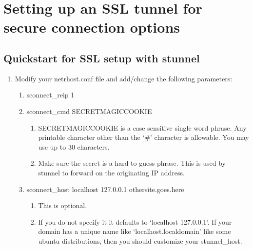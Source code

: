 \documentclass[letterpaper,10pt,english]{sphinxmanual}
\begin{document}
\section{Setting up an SSL tunnel for secure connection options}
\label{\detokenize{security:setting-up-an-ssl-tunnel-for-secure-connection-options}}

\subsection{Quickstart for SSL setup with stunnel}
\label{\detokenize{security:quickstart-for-ssl-setup-with-stunnel}}\begin{enumerate}
%
\item {} 
\sphinxAtStartPar
Modify your netrhost.conf file and add/change the following parameters:
\begin{enumerate}
%
\item {} 
\sphinxAtStartPar
sconnect\_reip 1

\item {} 
\sphinxAtStartPar
sconnect\_cmd SECRET\sphinxhyphen{}MAGIC\sphinxhyphen{}COOKIE
\begin{enumerate}
%
\item {} 
\sphinxAtStartPar
SECRET\sphinxhyphen{}MAGIC\sphinxhyphen{}COOKIE is a case sensitive single word phrase. Any printable character other than the ‘\#’ character is allowable.  You may use up to 30 characters.

\item {} 
\sphinxAtStartPar
Make sure the secret is a hard to guess phrase.  This is used by stunnel to forward on the originating IP address.

\end{enumerate}

\item {} 
\sphinxAtStartPar
sconnect\_host localhost 127.0.0.1 othersite.goes.here
\begin{enumerate}
%
\item {} 
\sphinxAtStartPar
This is optional.

\item {} 
\sphinxAtStartPar
If you do not specify it it defaults to ‘localhost 127.0.0.1’.  If your domain has a unique name like ‘localhost.localdomain’ like some ubuntu distributions, then you should customize your stunnel\_host.


\end{enumerate}
\end{enumerate}
\end{enumerate}
\end{document}
